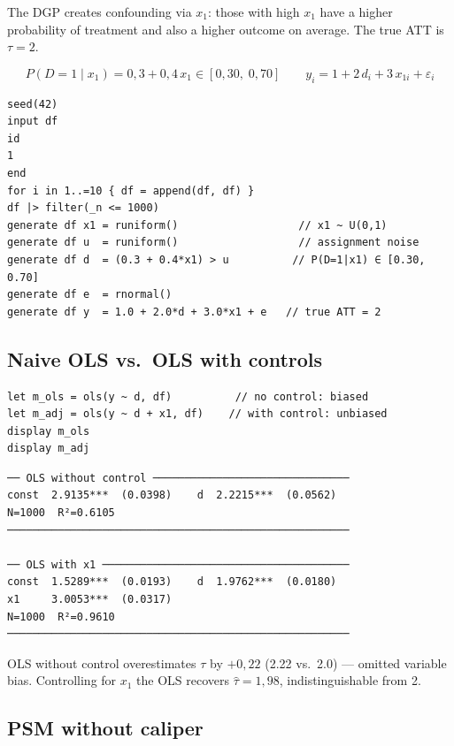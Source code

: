 The DGP creates confounding via $x_1$: those with high $x_1$ have a higher
probability of treatment and also a higher outcome on average. The true ATT is $\tau = 2$.

\[
  P(D=1 \mid x_1) = 0{,}3 + 0{,}4\,x_1 \in [0{,}30,\; 0{,}70]
  \qquad
  y_i = 1 + 2\,d_i + 3\,x_{1i} + \varepsilon_i
\]

\begin{lstlisting}[caption={DGP with selection on observables}]
seed(42)
input df
id
1
end
for i in 1..=10 { df = append(df, df) }
df |> filter(_n <= 1000)
generate df x1 = runiform()                   // x1 ~ U(0,1)
generate df u  = runiform()                   // assignment noise
generate df d  = (0.3 + 0.4*x1) > u          // P(D=1|x1) ∈ [0.30, 0.70]
generate df e  = rnormal()
generate df y  = 1.0 + 2.0*d + 3.0*x1 + e   // true ATT = 2
\end{lstlisting}

\subsection*{Naive OLS vs.\ OLS with controls}

\begin{lstlisting}[caption={OLS comparison without and with x1 control}]
let m_ols = ols(y ~ d, df)          // no control: biased
let m_adj = ols(y ~ d + x1, df)    // with control: unbiased
display m_ols
display m_adj
\end{lstlisting}

\begin{lstlisting}[language={}, basicstyle=\ttfamily\small,
  frame=none, numbers=none, backgroundcolor=\color{codbg},
  xleftmargin=0pt, xrightmargin=0pt, breaklines=false]
── OLS without control ───────────────────────────────
const  2.9135***  (0.0398)    d  2.2215***  (0.0562)
N=1000  R²=0.6105
──────────────────────────────────────────────────────

── OLS with x1 ───────────────────────────────────────
const  1.5289***  (0.0193)    d  1.9762***  (0.0180)
x1     3.0053***  (0.0317)
N=1000  R²=0.9610
──────────────────────────────────────────────────────
\end{lstlisting}

OLS without control overestimates $\tau$ by $+0{,}22$ (2.22 vs.\ 2.0) — omitted
variable bias. Controlling for $x_1$ the OLS recovers $\hat\tau = 1{,}98$,
indistinguishable from 2.

\subsection*{PSM without caliper}

